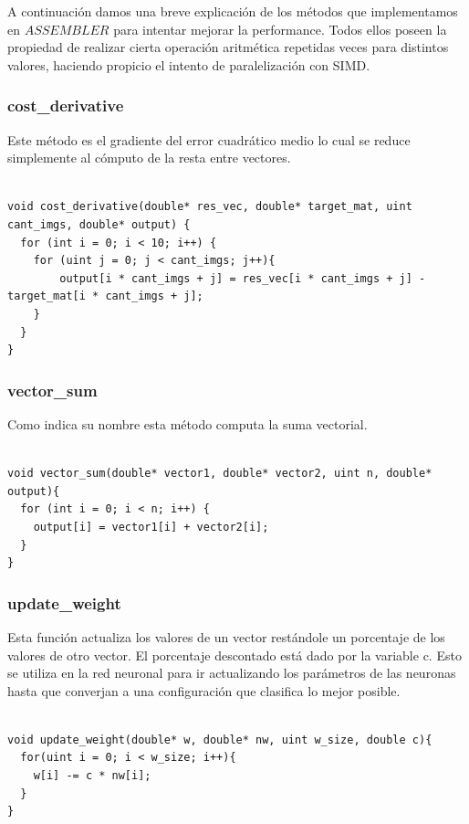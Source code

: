 A continuación damos una breve explicación de los métodos que implementamos en $ASSEMBLER$ para intentar mejorar la performance. Todos ellos poseen la propiedad de realizar cierta operación aritmética repetidas veces para distintos valores, haciendo propicio el intento de paralelización con SIMD.

\subsubsection{cost\_derivative}

Este método es el gradiente del error cuadrático medio lo cual se reduce simplemente al cómputo de la resta entre vectores.
\\
\\
\begin{lstlisting}
void cost_derivative(double* res_vec, double* target_mat, uint cant_imgs, double* output) {
  for (int i = 0; i < 10; i++) {
    for (uint j = 0; j < cant_imgs; j++){
        output[i * cant_imgs + j] = res_vec[i * cant_imgs + j] - target_mat[i * cant_imgs + j];
    }
  }
}
\end{lstlisting}

\subsubsection{vector\_sum}

Como indica su nombre esta método computa la suma vectorial.
\\
\\
\begin{lstlisting}[frame=single]
void vector_sum(double* vector1, double* vector2, uint n, double* output){
  for (int i = 0; i < n; i++) {
    output[i] = vector1[i] + vector2[i];
  }
}
\end{lstlisting}


\subsubsection{update\_weight}

Esta función actualiza los valores de un vector restándole un porcentaje de los valores de otro vector. El porcentaje descontado está dado por la variable c. Esto se utiliza en la red neuronal para ir actualizando los parámetros de las neuronas hasta que converjan a una configuración que clasifica lo mejor posible.
\\
\\
\begin{lstlisting}[frame=single]
void update_weight(double* w, double* nw, uint w_size, double c){
  for(uint i = 0; i < w_size; i++){
    w[i] -= c * nw[i];
  }
}
\end{lstlisting}

